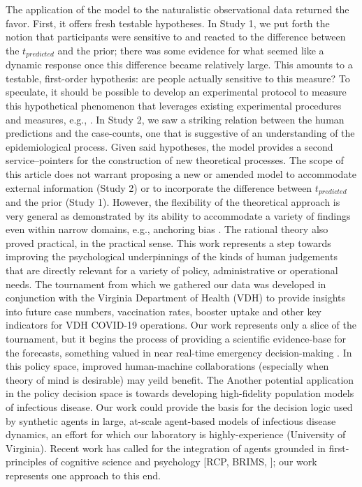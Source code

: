 \documentclass[a4paper,man,natbib]{apa6}
\begin{document}
The application of the model to the naturalistic observational data returned the favor. First, it offers fresh testable hypotheses.  In Study 1, we put forth the notion that participants were sensitive to and reacted to the difference between the $t_{predicted}$ and the prior; there was some evidence for what seemed like a dynamic response once this difference became relatively large.  This amounts to a testable, first-order hypothesis: are people actually sensitive to this measure?  To speculate, it should be possible to develop an experimental protocol to measure this hypothetical phenomenon that leverages existing experimental procedures and measures, e.g., \citep{sussman2007role}.  In Study 2, we saw a striking relation between the human predictions and the case-counts, one that is suggestive of an understanding of the epidemiological process. Given said hypotheses, the model provides a second service--pointers for the construction of new theoretical processes.  The scope of this article does not warrant proposing a new or amended model to accommodate external information (Study 2) or to incorporate the difference between $t_{predicted}$ and the prior (Study 1).  However, the flexibility of the theoretical approach is very general as demonstrated by its ability to accommodate a variety of findings even within narrow domains, e.g., anchoring bias \citep{Lieder2018}. 
The rational theory also proved practical, in the practical sense.  This work represents a step towards improving the psychological underpinnings of the kinds of human judgements that are directly relevant for a variety of policy, administrative or operational needs.  The tournament from which we gathered our data was developed in conjunction with the Virginia Department of Health (VDH) to provide insights into future case numbers, vaccination rates, booster uptake and other key indicators for VDH COVID-19 operations.  Our work represents only a slice of the tournament, but it begins the process of providing a scientific evidence-base for the forecasts, something valued in near real-time emergency decision-making \citep{Galea2021}.  
%
In this policy space, improved human-machine collaborations (especially when theory of mind is desirable) may yeild benefit.  The    
%
Another potential application in the policy decision space is towards developing high-fidelity population models of infectious disease.  Our work could provide the basis for the decision logic used by synthetic agents in large, at-scale agent-based models of infectious disease dynamics, an effort for which our laboratory is highly-experience (University of Virginia).  Recent work has called for the integration of agents grounded in first-principles of cognitive science and psychology [RCP, BRIMS, ]; our work represents one approach to this end.









%    
\end{document}
